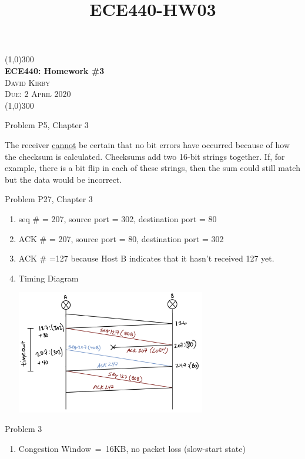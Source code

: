 \documentclass{article}
\title{ECE440-HW03}
\begin{document}
\begin{center}
    \line(1,0){300}\\[0.25cm]
 	\LARGE{\bfseries ECE440: Homework \#3}\\
 	\textsc{\LARGE David Kirby}\\
 	\textsc{\Large Due: 2 April 2020}\\  
 	\line(1,0){300}\\[1.0cm]
\end{center}
\begin{enumerate}
\large{\bfseries \item Problem P5, Chapter 3}\par
The receiver \underline{cannot} be certain that no bit errors have occurred because of how the checksum is calculated. Checksums add two 16-bit strings together. If, for example, there is a bit flip in each of these strings, then the sum could still match but the data would be incorrect.\par
\large{\bfseries \item Problem P27, Chapter 3}\par
    \begin{enumerate}
      \item seq \# = 207, source port = 302, destination port = 80
      \item ACK \# = 207, source port = 80, destination port = 302
       \item ACK \# =127 because Host B indicates that it hasn't received 127 yet.
       \item Timing Diagram\par
        \centering
        \includegraphics[width=0.65\textwidth]{HW3_P2.jpeg}
    \end{enumerate}
\large{\bfseries \item Problem 3}\par
    \begin{enumerate}
        \item Congestion Window\ =\ 16KB, no packet loss (slow-start state)

\end{enumerate}
\end{enumerate}
\end{document}
